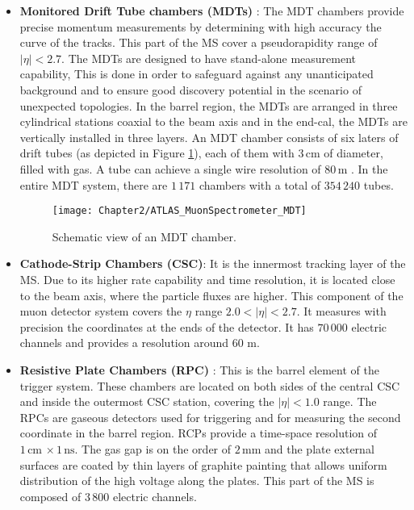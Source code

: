 \begin{itemize}
	\item \textbf{Monitored Drift Tube chambers (MDTs)} \cite{Livan:319197}: 
		The MDT chambers provide precise momentum
		measurements by determining with high accuracy 
		the curve of the tracks. This part of the MS cover a 
		pseudorapidity range of $|\eta| < 2.7$. The MDTs are designed to 
		have stand-alone measurement capability, This is done in order to 
		safeguard against any unanticipated background and to ensure 
		good discovery potential in the scenario of unexpected topologies. 
		In the barrel region, the MDTs are arranged in three cylindrical stations 
		coaxial to the beam axis and in the end-cal, the MDTs are vertically installed in three layers. 
		An MDT chamber  consists of six laters of drift tubes (as depicted in Figure 
		\ref{fig:Chap2:ATLAS:MS:MDT}), each of them with $3\,$cm of diameter, filled with gas. 
		A tube can achieve a single wire resolution of $80\,$\textmu m \cite{Ishii:2001hy}.
		In the entire MDT system, there are $1\,171$ chambers with a total of $354\,240$ tubes.
		
		\begin{figure}[h]
 		  \centering
  		\texttt{[image: Chapter2/ATLAS\_MuonSpectrometer\_MDT]}
  		\caption{Schematic view of an MDT chamber.}
  		\label{fig:Chap2:ATLAS:MS:MDT}
		\end{figure}

	\item \textbf{Cathode-Strip Chambers (CSC)}: It is the innermost tracking layer of the MS. 
		Due to its higher rate capability and time resolution, it is located close to the beam 
		axis, where the particle fluxes are higher. This component of the muon detector system
		covers the $\eta$ range $2.0 < |\eta| < 2.7$. It measures with precision the coordinates 
		at the ends of the detector. It has $70\,000$ electric channels and provides a resolution 
		around 60 \textmu m. 
		
	\item \textbf{Resistive Plate Chambers (RPC)} \cite{Cattani_2011}: This is the barrel element of the trigger system. 
		These chambers are located on both sides of the central CSC and inside the outermost CSC station, covering
		the $|\eta| < 1.0$ range.
		The RPCs are gaseous detectors used for triggering and for measuring the second coordinate in the barrel region.
		RCPs provide a time-space resolution of $1 \, \textrm{cm} \, \times  1\,\textrm{ns}$.
		The gas gap is on the order of $2\,$mm and the plate external surfaces are coated by thin layers of graphite 
		painting that allows uniform distribution of the high voltage along the plates.
		This part of the MS  is composed of $3\,800$ electric channels.
		

\end{itemize}
